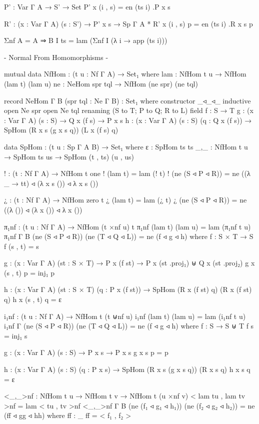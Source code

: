 \begin{code}
  P' : Var Γ A → S' → Set
  P' x (i , s) = en (ts i) .P x s

  R' : (x : Var Γ A) (s : S') → P' x s → Sp Γ A *
  R' x (i , s) p = en (ts i) .R x s p
  
Σnf {A = A ⇒ B} I ts = lam (Σnf I (λ i → app (ts i)))

{- Normal From Homomorphisms -}

mutual
  data NfHom : (t u : Nf Γ A) → Set₁ where
    lam : NfHom t u → NfHom (lam t) (lam u)
    ne  : NeHom spr tql → NfHom (ne spr) (ne tql)

  record NeHom {Γ} {B} (spr tql : Ne Γ B) : Set₁ where
    constructor _◃_◃_
    inductive
    open Ne spr
    open Ne tql renaming (S to T; P to Q; R to L)
    field
      f : S → T
      g : (x : Var Γ A) (s : S) → Q x (f s) → P x s
      h : (x : Var Γ A) (s : S) (q : Q x (f s))
        → SpHom (R x s (g x s q)) (L x (f s) q)
        
  data SpHom : (t u : Sp Γ A B) → Set₁ where
    ε   : SpHom ts ts
    _,_ : NfHom t u → SpHom ts us → SpHom (t , ts) (u , us)

! : (t : Nf Γ A) → NfHom t one
! (lam t) = lam (! t)
! (ne (S ◃ P ◃ R)) = ne ((λ _ → tt) ◃ (λ x s ()) ◃ λ x s ())

¿ : (t : Nf Γ A) → NfHom zero t
¿ (lam t) = lam (¿ t)
¿ (ne (S ◃ P ◃ R)) = ne ((λ ()) ◃ (λ x ()) ◃ λ x ())

π₁nf : (t u : Nf Γ A) → NfHom (t ×nf u) t
π₁nf (lam t) (lam u) = lam (π₁nf t u)
π₁nf {Γ} {B} (ne (S ◃ P ◃ R)) (ne (T ◃ Q ◃ L)) = ne (f ◃ g ◃ h)
  where
  f : S × T → S
  f (s , t) = s

  g : (x : Var Γ A) (st : S × T) → P x (f st) → P x (st .proj₁) ⊎ Q x (st .proj₂)
  g x (s , t) p = inj₁ p

  h : (x : Var Γ A) (st : S × T) (q : P x (f st)) → SpHom (R x (f st) q) (R x (f st) q)
  h x (s , t) q = ε

i₁nf : (t u : Nf Γ A) → NfHom t (t ⊎nf u)
i₁nf (lam t) (lam u) = lam (i₁nf t u)
i₁nf {Γ} (ne (S ◃ P ◃ R)) (ne (T ◃ Q ◃ L)) = ne (f ◃ g ◃ h)
  where
  f : S → S ⊎ T
  f s = inj₁ s

  g : (x : Var Γ A) (s : S) → P x s → P x s
  g x s p = p

  h : (x : Var Γ A) (s : S) (q : P x s) → SpHom (R x s (g x s q)) (R x s q)
  h x s q = ε

<_,_>nf : NfHom t u → NfHom t v → NfHom t (u ×nf v)
< lam tu , lam tv >nf = lam < tu , tv >nf
<_,_>nf {Γ} {B} (ne (f₁ ◃ g₁ ◃ h₁)) (ne (f₂ ◃ g₂ ◃ h₂)) = ne (ff ◃ gg ◃ hh)
  where
  ff : _
  ff = < f₁ , f₂ >


\end{code}
